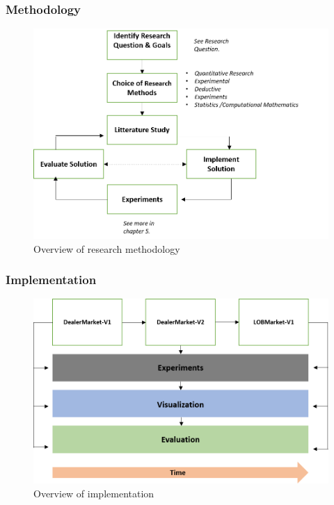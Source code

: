 \documentclass[aspectratio=1610]{beamer}
\begin{document}
\begin{frame}
  \frametitle{\hfill Methodology}

  \begin{block}{}
    \begin{figure}[H]
    \centering
    \includegraphics[scale=.50]{researchmethodsv3.PNG}
    \caption{Overview of research methodology}
    \label{fig:3}
\end{figure}
  \end{block}

\end{frame}

\begin{frame}
  \frametitle{\hfill Implementation}

  \begin{block}{}
    \begin{figure}[H]
    \centering
    \includegraphics[scale=.55]{implementation.png}
    \caption{Overview of implementation}
    \label{fig:4}
\end{figure}
  \end{block}

\end{frame}
\end{document}
